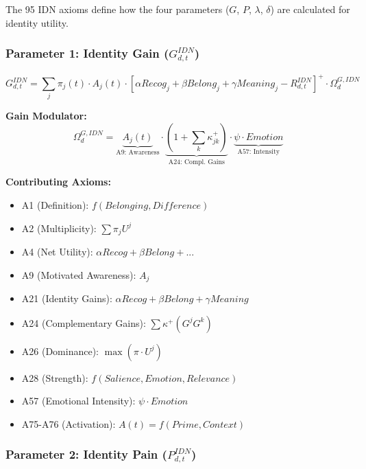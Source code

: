 The 95 IDN axioms define how the four parameters ($G$, $P$, $\lambda$, $\delta$) 
are calculated for identity utility.

\subsubsection{Parameter 1: Identity Gain ($G^{IDN}_{d,t}$)}

\begin{tcolorbox}[colback=orange!5!white, colframe=orange!50!black]
\begin{equation}
\boxed{
G^{IDN}_{d,t} = \sum_j \pi_j(t) \cdot A_j(t) \cdot \left[ \alpha Recog_j + \beta Belong_j + \gamma Meaning_j - R^{IDN}_{d,t} \right]^{+} \cdot \Omega^{G,IDN}_d
}
\end{equation}
\end{tcolorbox}

\textbf{Gain Modulator:}
\begin{equation}
\Omega^{G,IDN}_d = \underbrace{A_j(t)}_{\text{A9: Awareness}} \cdot 
                   \underbrace{(1 + \sum_k \kappa^+_{jk})}_{\text{A24: Compl. Gains}} \cdot 
                   \underbrace{\psi \cdot Emotion}_{\text{A57: Intensity}}
\end{equation}

\textbf{Contributing Axioms:}
\begin{itemize}
\item A1 (Definition): $f(Belonging, Difference)$
\item A2 (Multiplicity): $\sum \pi_j U^j$
\item A4 (Net Utility): $\alpha Recog + \beta Belong + ...$
\item A9 (Motivated Awareness): $A_j$
\item A21 (Identity Gains): $\alpha Recog + \beta Belong + \gamma Meaning$
\item A24 (Complementary Gains): $\sum \kappa^+ (G^j G^k)$
\item A26 (Dominance): $\max(\pi \cdot U^j)$
\item A28 (Strength): $f(Salience, Emotion, Relevance)$
\item A57 (Emotional Intensity): $\psi \cdot Emotion$
\item A75-A76 (Activation): $A(t) = f(Prime, Context)$
\end{itemize}

\subsubsection{Parameter 2: Identity Pain ($P^{IDN}_{d,t}$)}

